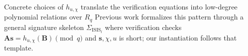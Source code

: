 Concrete choices of \(h_{u,\chi}\) translate the verification equations into low-degree
polynomial relations over \(R_q\)
Previous work \cite{cryptoeprint:2025/356} formalizes this pattern through a
general signature skeleton \(\Sigma_{\mathrm{ISIS_f}}\) where verification checks \(\mathbf{A}\mathbf{s}=h_{u,\chi}(\mathbf{B})\pmod q\)
and \(\mathbf{s},\chi,u\) is short; our instantiation follows that template. 

